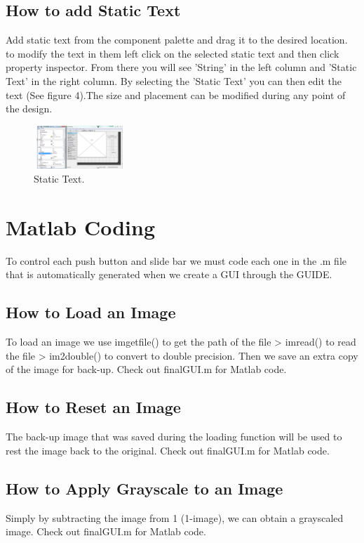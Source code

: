 \documentclass[a4paper]{article}
\begin{document}
\subsection{How to add Static Text}
Add static text from the component palette and drag it to the desired location. to modify the text in them left click on the selected static text and then click property inspector. From there you will see 'String' in the left column and 'Static Text' in the right column. By selecting the 'Static Text' you can then edit the text (See figure 4).The size and placement can be modified during any point of the design.

\begin{figure}
\centering
\includegraphics[width=0.3\textwidth]{Capture3.PNG}
\caption{\label{fig:Static Text}Static Text.}
\end{figure}

\section{Matlab Coding}
To control each push button and slide bar we must code each one in the .m file that is automatically generated when we create a GUI through the GUIDE.

\subsection{How to Load an Image}
To load an image we use imgetfile() to get the path of the file > imread() to read the file > im2double() to convert to double precision. Then we save an extra copy of the image for back-up. Check out finalGUI.m for Matlab code.

\subsection{How to Reset an Image}
The back-up image that was saved during the loading function will be used to rest the image back to the original. Check out finalGUI.m for Matlab code.

\subsection{How to Apply Grayscale to an Image}
Simply by subtracting the image from 1 (1-image), we can obtain a grayscaled image. Check out finalGUI.m for Matlab code.
\end{document}
